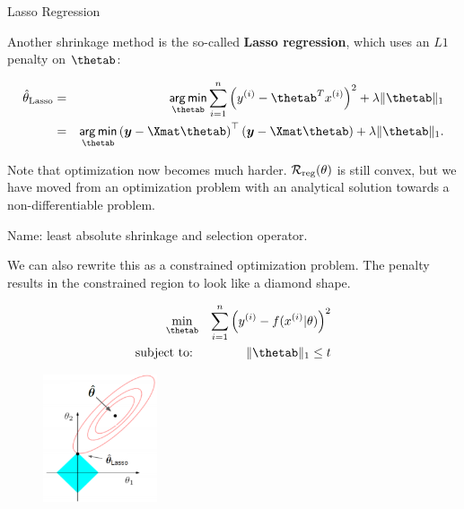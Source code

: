 
\begin{vbframe}{Lasso Regression}

Another shrinkage method is the so-called \textbf{Lasso regression}, which uses an $L1$ penalty on $\thetab$:

\begin{eqnarray*}
\thetah_{\text{Lasso}} &=&  \argmin_{\thetab} \sumin \left(\yi - \thetab^T \xi\right)^2 + \lambda \|\thetab\|_1 \\
  &=& \argmin_{\thetab} \left(\yv - \Xmat \thetab\right)^\top \left(\yv - \Xmat \thetab\right) + \lambda \|\thetab\|_1.
\end{eqnarray*}

Note that optimization now becomes much harder. $\mathcal{R}_{\text{reg}}(\theta)$ is still convex, but we have moved from an optimization problem with an analytical solution towards a non-differentiable problem.

\lz

Name: least absolute shrinkage and selection operator.

\framebreak 

We can also rewrite this as a constrained optimization problem. The penalty results in the constrained region to look like a diamond shape.

\begin{eqnarray*}
\min_{\thetab} && \sumin \left(\yi - \fxit\right)^2\\
\text{subject to: } && \|\thetab\|_1 \leq t \\
\end{eqnarray*}

\vspace*{-1cm}

  \begin{figure}
\includegraphics[width=0.3\textwidth]{figure_man/lasso_hat.png}\\
\end{figure}

\end{vbframe}


\endlecture


